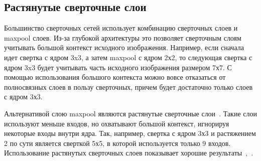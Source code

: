 \subsection{Растянутые сверточные слои}

Большинство сверточных сетей использует комбинацию сверточных слоев и maxpool слоев. Из-за глубокой архитектуры это позволяет сверточным слоям учитывать большой контекст исходного изображения. Например, если сначала идет свертка с ядром 3x3, а затем maxpool с ядром 2х2, то следующая свертка с ядром 3x3 будет учитывать часть исходного изображения размером 7х7. С помощью использования большого контекста можно вовсе отказаться от полносвязных слоев в пользу сверточных, причем будет достаточно только слоев с ядром 3х3.

Альтернативой слою maxpool являются растянутые сверточные слои~\cite{dilated_conv}. Такие слои используют меньше входов, но охватывают большой контекст, игнорируя некоторые входы внутри ядра. Так, например, свертка с ядром 3х3 и растяжением 2 по сути является сверткой 5х5, в которой используется только 9 входов. Использование растянутых сверточных слоев показывает хорошие результаты~\cite{segm_dcnn_crf},~\cite{deeplab}.


\iffalse
\subsection{DeepLab}
\fi
